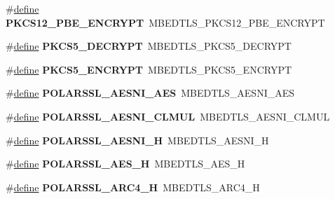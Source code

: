 \begin{DoxyCompactItemize}
\item 
\mbox{\label{compat-1_83_8h_a6cadcbe1c384d25892634c43169415bc}} 
\#\hyperlink{structdefine}{define} {\bfseries P\+K\+C\+S12\+\_\+\+P\+B\+E\+\_\+\+E\+N\+C\+R\+Y\+PT}~M\+B\+E\+D\+T\+L\+S\+\_\+\+P\+K\+C\+S12\+\_\+\+P\+B\+E\+\_\+\+E\+N\+C\+R\+Y\+PT
\item 
\mbox{\label{compat-1_83_8h_abb7e70622c3563f184286355e9408a35}} 
\#\hyperlink{structdefine}{define} {\bfseries P\+K\+C\+S5\+\_\+\+D\+E\+C\+R\+Y\+PT}~M\+B\+E\+D\+T\+L\+S\+\_\+\+P\+K\+C\+S5\+\_\+\+D\+E\+C\+R\+Y\+PT
\item 
\mbox{\label{compat-1_83_8h_ad5ad0d9541143890a55d7fc7b72d9709}} 
\#\hyperlink{structdefine}{define} {\bfseries P\+K\+C\+S5\+\_\+\+E\+N\+C\+R\+Y\+PT}~M\+B\+E\+D\+T\+L\+S\+\_\+\+P\+K\+C\+S5\+\_\+\+E\+N\+C\+R\+Y\+PT
\item 
\mbox{\label{compat-1_83_8h_a00d73908998e6cbd968282e4cd975a33}} 
\#\hyperlink{structdefine}{define} {\bfseries P\+O\+L\+A\+R\+S\+S\+L\+\_\+\+A\+E\+S\+N\+I\+\_\+\+A\+ES}~M\+B\+E\+D\+T\+L\+S\+\_\+\+A\+E\+S\+N\+I\+\_\+\+A\+ES
\item 
\mbox{\label{compat-1_83_8h_a5835d24a13489804c4f9880468a292e2}} 
\#\hyperlink{structdefine}{define} {\bfseries P\+O\+L\+A\+R\+S\+S\+L\+\_\+\+A\+E\+S\+N\+I\+\_\+\+C\+L\+M\+UL}~M\+B\+E\+D\+T\+L\+S\+\_\+\+A\+E\+S\+N\+I\+\_\+\+C\+L\+M\+UL
\item 
\mbox{\label{compat-1_83_8h_ab390e2103cde39009ee3e49e6e271bff}} 
\#\hyperlink{structdefine}{define} {\bfseries P\+O\+L\+A\+R\+S\+S\+L\+\_\+\+A\+E\+S\+N\+I\+\_\+H}~M\+B\+E\+D\+T\+L\+S\+\_\+\+A\+E\+S\+N\+I\+\_\+H
\item 
\mbox{\label{compat-1_83_8h_afa16cf2af588b4addff7291bcce41729}} 
\#\hyperlink{structdefine}{define} {\bfseries P\+O\+L\+A\+R\+S\+S\+L\+\_\+\+A\+E\+S\+\_\+H}~M\+B\+E\+D\+T\+L\+S\+\_\+\+A\+E\+S\+\_\+H
\item 
\mbox{\label{compat-1_83_8h_ae2ff913608b38bc7dbfb4d4565833a2c}} 
\#\hyperlink{structdefine}{define} {\bfseries P\+O\+L\+A\+R\+S\+S\+L\+\_\+\+A\+R\+C4\+\_\+H}~M\+B\+E\+D\+T\+L\+S\+\_\+\+A\+R\+C4\+\_\+H

\end{DoxyCompactItemize}
